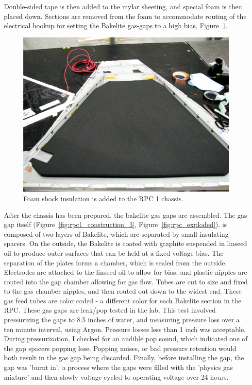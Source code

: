 Double-sided tape is then added to the mylar sheeting, and special foam is then
placed down. Sections are removed from the foam to accommodate routing of the
electrical hookup for setting the Bakelite gas-gaps to a high bias,
Figure~\ref{fig:rpc1_construction_2}.

\begin{figure}
  \centering
  \includegraphics[width=0.7\linewidth]{./figures/rpc1_construction_2}
  \caption{
    Foam shock insulation is added to the RPC 1 chassis.
  }
  \label{fig:rpc1_construction_2}
\end{figure}

After the chassis has been prepared, the bakelite gas gaps are assembled. The
gas gap itself (Figure~\ref{fig:rpc1_construction_3},
Figure~\ref{fig:rpc_exploded}), is composed of two layers of Bakelite, which are
separated by small insulating spacers. On the outside, the Bakelite is coated
with graphite suspended in linseed oil to produce outer surfaces that can be
held at a fixed voltage bias.  The separation of the plates forms a chamber,
which is sealed from the outside.  Electrodes are attached to the linseed oil to
allow for bias, and plastic nipples are routed into the gap chamber allowing for
gas flow. Tubes are cut to size and fixed to the gas chamber nipples, and then
routed out down to the widest end. These gas feed tubes are color coded - a
different color for each Bakelite section in the RPC. These gas gaps are
leak/pop tested in the lab.  This test involved pressurizing the gaps to 8.5
inches of water, and measuring pressure loss over a ten minute interval, using
Argon. Pressure losses less than 1 inch was acceptable. During pressurization, I
checked for an audible pop sound, which indicated one of the gap spacers popping
lose. Popping noises, or bad pressure retention would both result in the gas gap
being discarded.  Finally, before installing the gap, the gap was 'burnt in', a
process where the gaps were filled with the 'physics gas mixture' and then
slowly voltage cycled to operating voltage over 24 hours.

